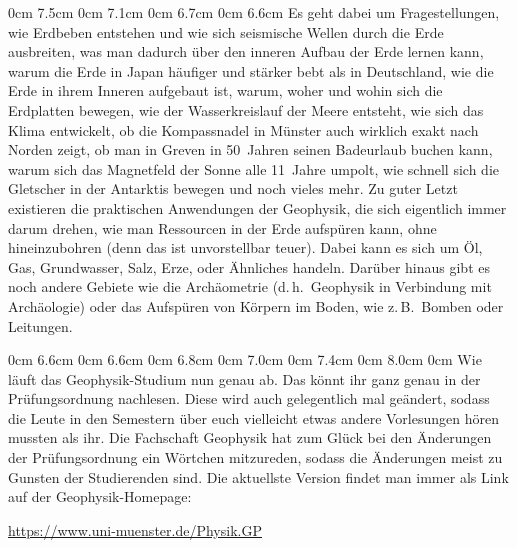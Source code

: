 \begin{multicols}{2}
0cm \columnwidth
0cm \columnwidth
0cm \columnwidth
0cm \columnwidth
0cm \columnwidth
0cm \columnwidth
0cm \columnwidth
0cm \columnwidth
0cm \columnwidth
0cm \columnwidth
0cm \columnwidth
0cm \columnwidth
0cm \columnwidth
0cm \columnwidth
0cm \columnwidth
0cm \columnwidth
0cm \columnwidth
0cm \columnwidth
0cm \columnwidth
0cm \columnwidth
0cm 7.5cm
0cm 7.1cm
0cm 6.7cm
0cm 6.6cm
Es geht dabei um Fragestellungen, wie Erdbeben entstehen und wie sich seismische Wellen durch die Erde ausbreiten, was man dadurch über den inneren Aufbau der Erde lernen kann, warum die Erde in Japan häufiger und stärker bebt als in Deutschland, wie die Erde in ihrem Inneren aufgebaut ist, warum, woher und wohin sich die Erdplatten bewegen, wie der Wasserkreislauf der Meere entsteht, wie sich das Klima entwickelt, ob die Kompassnadel in Münster auch wirklich exakt nach Norden zeigt, ob man in Greven in 50~Jahren seinen Badeurlaub buchen kann, warum sich das Magnetfeld der Sonne alle 11~Jahre umpolt, wie schnell sich die Gletscher in der Antarktis bewegen und noch vieles mehr.
Zu guter Letzt existieren die praktischen Anwendungen der Geophysik, die sich eigentlich immer darum drehen, wie man Ressourcen in der Erde aufspüren kann, ohne hineinzubohren (denn das ist unvorstellbar teuer).
Dabei kann es sich um Öl, Gas, Grundwasser, Salz, Erze, oder Ähnliches handeln.
Darüber hinaus gibt es noch andere Gebiete wie die Archäometrie (d.\,h.\ Geophysik in Verbindung mit Archäologie) oder das Aufspüren von Körpern im Boden, wie z.\,B.\ Bomben oder Leitungen.

{}
0cm 6.6cm
0cm 6.6cm
0cm 6.8cm
0cm 7.0cm
0cm 7.4cm
0cm 8.0cm
0cm \columnwidth
0cm \columnwidth
0cm \columnwidth
0cm \columnwidth
0cm \columnwidth
Wie läuft das Geophysik-Studium nun genau ab.
Das könnt ihr ganz genau in der Prüfungsordnung nachlesen.
Diese wird auch gelegentlich mal geändert, sodass die Leute in den Semestern über euch vielleicht etwas andere Vorlesungen hören mussten als ihr.
Die Fachschaft Geophysik hat zum Glück bei den Änderungen der Prüfungsordnung ein Wörtchen mitzureden, sodass die Änderungen meist zu Gunsten der Studierenden sind.
Die aktuellste Version findet man immer als Link auf der Geophysik-Homepage:
\begin{center}
	\url{https://www.uni-muenster.de/Physik.GP}
\end{center}


\end{multicols}
